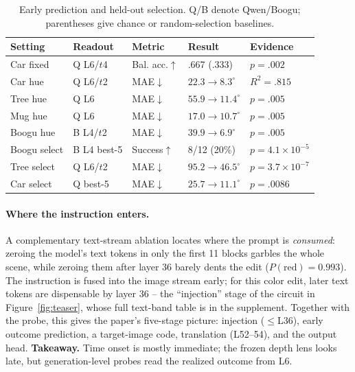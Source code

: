 \documentclass[letterpaper]{article} %
\begin{document}
\begin{table}[t]
\caption{Early prediction and held-out selection. Q/B denote Qwen/Boogu;
parentheses give chance or random-selection baselines.}
\label{tab:early}
\centering
\footnotesize
\setlength{\tabcolsep}{2.1pt}
\begin{tabular}{@{}lllll@{}}
\toprule
Setting & Readout & Metric & Result & Evidence \\
\midrule
Car fixed & Q L6/$t$4 & Bal. acc.$\uparrow$ & .667 (.333) & $p{=}.002$ \\
Car hue & Q L6/$t$2 & MAE$\downarrow$ & $22.3{\to}8.3^\circ$ & $R^2{=}.815$ \\
Tree hue & Q L6 & MAE$\downarrow$ & $55.9{\to}11.4^\circ$ & $p{=}.005$ \\
Mug hue & Q L6 & MAE$\downarrow$ & $17.0{\to}10.7^\circ$ & $p{=}.005$ \\
Boogu hue & B L4/$t$2 & MAE$\downarrow$ & $39.9{\to}6.9^\circ$ & $p{=}.005$ \\
Boogu select & B L4 best-5 & Success$\uparrow$ & 8/12 (20\%) & $p{=}4.1{\times}10^{-5}$ \\
Tree select & Q L6/$t$2 & MAE$\downarrow$ & $95.2{\to}46.5^\circ$ & $p{=}3.7{\times}10^{-7}$ \\
Car select & Q best-5 & MAE$\downarrow$ & $25.7{\to}11.1^\circ$ & $p{=}.0086$ \\
\bottomrule
\end{tabular}
\end{table}

\paragraph{Where the instruction enters.} A complementary text-stream
ablation locates where the prompt is \emph{consumed}: zeroing the model's
text tokens in only the first 11 blocks garbles the whole scene, while
zeroing them after layer 36 barely dents the edit ($P(\text{red}){=}0.993$).
The instruction is fused into the image stream early; for this color edit,
later text tokens are dispensable by layer 36 -- the ``injection'' stage of the circuit in
Figure~\ref{fig:teaser}, whose full text-band table is in the supplement.
Together with the probe, this gives the paper's five-stage picture:
injection ($\le$L36), early outcome prediction, a target-image code, translation
(L52--54), and the output head.
\noindent\textbf{Takeaway.} Time onset is mostly immediate; the frozen depth
lens looks late, but generation-level probes read the realized outcome from L6.
\end{document}
